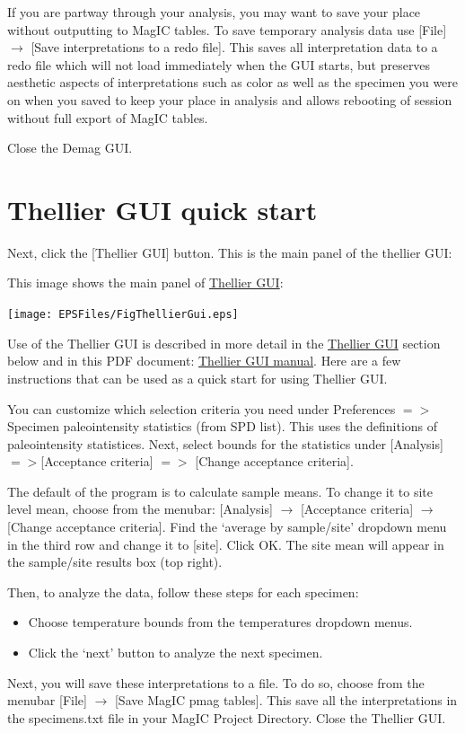 \documentclass[11pt]{book}
\begin{document}
{{If you are partway through your analysis, you may want to save your place without outputting to MagIC tables.  To save temporary analysis data use [File] $\rightarrow$ [Save interpretations to a redo file]. This saves all interpretation data to a redo file which will not load immediately when the GUI starts, but preserves aesthetic aspects of interpretations such as color as well as the specimen you were on when you saved to keep your place in analysis and allows rebooting of session without full export of MagIC tables.

Close the Demag GUI.



\section{Thellier GUI quick start}
Next, click the [Thellier GUI] button.  This is the main panel of the thellier GUI:

This image shows the main panel of \href{#ThellierGUI}{Thellier GUI}:

\texttt{[image: EPSFiles/FigThellierGui.eps]}

Use of the Thellier GUI is described in more detail in the \href{#thellier_GUI.py}{Thellier GUI} section below and in this PDF document: \href{https://github.com/PmagPy/PmagPy-Cookbook/blob/gh-pages/thellier_GUI_full_manual.pdf}{Thellier GUI manual}. Here are a few instructions that can be used as a quick start for using Thellier GUI.

You can customize which selection criteria you need  under Preferences $=>$ Specimen paleointensity statistics (from SPD list).  This uses the \cite{paterson14} definitions of paleointensity statistices.
Next, select bounds for the statistics under [Analysis] $=>$[Acceptance criteria] $=>$ [Change acceptance criteria].

The default of the program is to calculate sample means. To change it to site level mean, choose from the menubar: [Analysis] $\rightarrow$ [Acceptance criteria] $\rightarrow$  [Change acceptance criteria]. Find the `average by sample/site' dropdown menu in the third row and change it to [site]. Click OK. The site mean will appear in the sample/site results box (top right).

Then, to analyze the data, follow these steps for each specimen:
 \begin{itemize}
 \item Choose temperature bounds from the temperatures dropdown menus.
 \item  Click the ‘next’ button to analyze the next specimen.
   \end{itemize}
Next, you will save these interpretations to a file.  To do so, choose from the menubar [File] $\rightarrow$ [Save MagIC pmag tables]. This save all the interpretations in the specimens.txt file in your MagIC Project Directory.
Close the Thellier GUI.


}}
\end{document}
